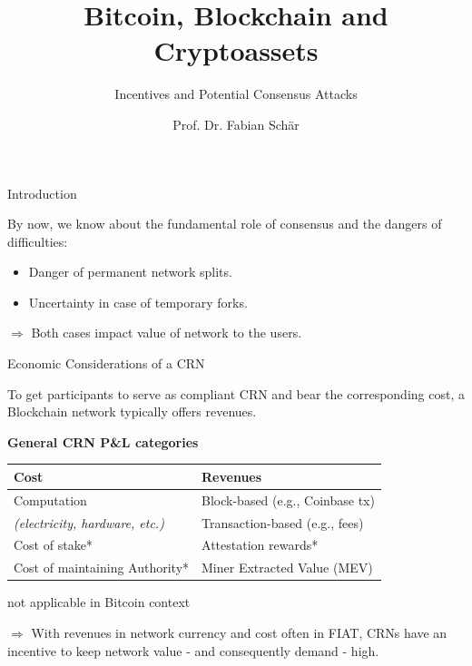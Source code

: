 \documentclass[handout]{beamer}
\title{Bitcoin, Blockchain and Cryptoassets}
\subtitle{Incentives and Potential Consensus Attacks}
\author{Prof. Dr. Fabian Schär}
\institute{University of Basel}
\begin{document}
\thispagestyle{empty}
\begin{frame}[noframenumbering]
	\titlepage
\end{frame}

\begin{frame}{Introduction}

By now, we know about the fundamental role of consensus and the dangers of difficulties:
	\begin{itemize}
		\item Danger of permanent network splits.
		\item Uncertainty in case of temporary forks.
	\end{itemize}
	
\vspace{0.5 em}
$\Rightarrow$ Both cases impact value of network to the users.

\vspace{1.5 em}

\end{frame}

\begin{frame}{Economic Considerations of a CRN}

To get participants to serve as compliant CRN and bear the corresponding cost, a Blockchain network typically offers revenues.

\vspace{1 em}

\footnotesize
\textbf{General CRN P\&L categories}
\begin{table}
	{\renewcommand{\arraystretch}{1.3}%
  \center
  \begin{tabular}[]{p{} | p{}}
		\textbf{Cost} & \textbf{Revenues}      \\
		\hline
		Computation & Block-based (e.g., Coinbase tx)\\
		\textit{(electricity, hardware, etc.)} & Transaction-based (e.g., fees)\\
		Cost of stake* & Attestation rewards*\\
		Cost of maintaining Authority* & Miner Extracted Value (MEV)
  \end{tabular}}
\end{table}

\scriptsize *not applicable in Bitcoin context

\vspace{1 em}
\normalsize
$\Rightarrow$ With revenues in network currency and cost often in FIAT, CRNs have an incentive to keep network value - and consequently demand - high.
	
\end{frame}
\end{document}
